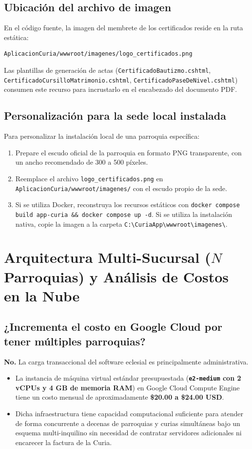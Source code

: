 \subsection{Ubicación del archivo de imagen}
En el código fuente, la imagen del membrete de los certificados reside en la ruta estática:
\begin{lstlisting}[style=consola]
AplicacionCuria/wwwroot/imagenes/logo_certificados.png
\end{lstlisting}
Las plantillas de generación de actas (\texttt{CertificadoBautizmo.cshtml}, \texttt{CertificadoCursilloMatrimonio.cshtml}, \texttt{CertificadoPaseDeNivel.cshtml}) consumen este recurso para incrustarlo en el encabezado del documento PDF.

\subsection{Personalización para la sede local instalada}
Para personalizar la instalación local de una parroquia específica:
\begin{enumerate}
    \item Prepare el escudo oficial de la parroquia en formato PNG transparente, con un ancho recomendado de 300 a 500 píxeles.
    \item Reemplace el archivo \texttt{logo\_certificados.png} en \texttt{AplicacionCuria/wwwroot/imagenes/} con el escudo propio de la sede.
    \item Si se utiliza Docker, reconstruya los recursos estáticos con \texttt{docker compose build app-curia \&\& docker compose up -d}. Si se utiliza la instalación nativa, copie la imagen a la carpeta \texttt{C:\textbackslash CuriaApp\textbackslash wwwroot\textbackslash imagenes\textbackslash}.
\end{enumerate}

\section{Arquitectura Multi-Sucursal ($N$ Parroquias) y Análisis de Costos en la Nube}

\subsection{¿Incrementa el costo en Google Cloud por tener múltiples parroquias?}
\textbf{No.} La carga transaccional del software eclesial es principalmente administrativa.
\begin{itemize}
    \item La instancia de máquina virtual estándar presupuestada (\textbf{\texttt{e2-medium} con 2 vCPUs y 4 GB de memoria RAM}) en Google Cloud Compute Engine tiene un costo mensual de aproximadamente \textbf{\$20.00 a \$24.00 USD}.
    \item Dicha infraestructura tiene capacidad computacional suficiente para atender de forma concurrente a decenas de parroquias y curias simultáneas bajo un esquema multi-inquilino sin necesidad de contratar servidores adicionales ni encarecer la factura de la Curia.
\end{itemize}

